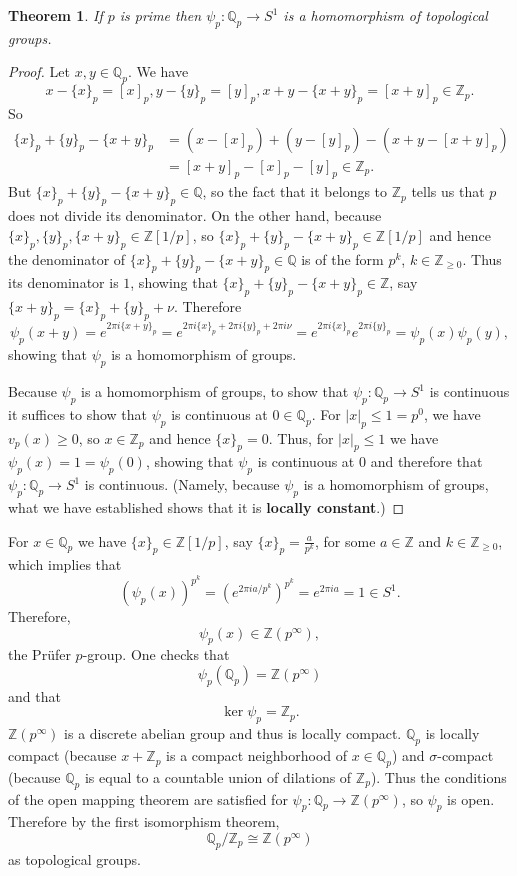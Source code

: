 \documentclass{article}
\newtheorem{theorem}{Theorem}
\theoremstyle{definition}
\begin{document}
\begin{theorem}
If $p$ is prime then $\psi_p:\mathbb{Q}_p \to S^1$ is a homomorphism of topological groups.
\label{psip}
\end{theorem}
\begin{proof}
Let $x,y \in \mathbb{Q}_p$. We have
\[
x-\{x\}_p=[x]_p,  y-\{y\}_p=[y]_p, 
x+y-\{x+y\}_p=[x+y]_p \in \mathbb{Z}_p.
\]
So
\begin{align*}
\{x\}_p+\{y\}_p-\{x+y\}_p& = (x-[x]_p)+(y-[y]_p)-(x+y-[x+y]_p)\\
&=
[x+y]_p - [x]_p - [y]_p \in \mathbb{Z}_p.
\end{align*}
But $\{x\}_p+\{y\}_p-\{x+y\}_p \in \mathbb{Q}$, so the fact that it belongs to $\mathbb{Z}_p$ tells us that $p$ does not divide
its denominator. On the other hand, because $\{x\}_p,\{y\}_p,\{x+y\}_p \in \mathbb{Z}[1/p]$, so 
$\{x\}_p+\{y\}_p-\{x+y\}_p \in \mathbb{Z}[1/p]$ and hence the denominator of $\{x\}_p+\{y\}_p-\{x+y\}_p \in \mathbb{Q}$ is of the form $p^k$, $k \in \mathbb{Z}_{\geq 0}$.
Thus its denominator is $1$, showing that $\{x\}_p+\{y\}_p-\{x+y\}_p \in \mathbb{Z}$,
say $\{x+y\}_p = \{x\}_p+\{y\}_p + \nu$.
Therefore
\[
\psi_p(x+y) = e^{2\pi i\{x+y\}_p}
=e^{2\pi i\{x\}_p + 2\pi i\{y\}_p + 2\pi i\nu}
=e^{2\pi i\{x\}_p} e^{2\pi i \{y\}_p}
=\psi_p(x) \psi_p(y),
\]
showing that $\psi_p$ is a homomorphism of groups.

Because $\psi_p$ is a homomorphism of groups, to show that $\psi_p:\mathbb{Q}_p \to S^1$ is continuous it suffices to show that
$\psi_p$ is continuous at $0 \in \mathbb{Q}_p$. 
For $|x|_p \leq 1=p^0$, we have $v_p(x) \geq 0$, so $x \in \mathbb{Z}_p$ and hence
$\{x\}_p=0$. Thus, for $|x|_p \leq 1$ we have $\psi_p(x)=1=\psi_p(0)$, showing that $\psi_p$ is continuous at $0$ and therefore
that $\psi_p:\mathbb{Q}_p \to S^1$ is continuous. (Namely, because $\psi_p$ is a homomorphism of groups, what we have
established shows that it is \textbf{locally constant}.)
\end{proof}

For $x \in \mathbb{Q}_p$ we have $\{x\}_p \in \mathbb{Z}[1/p]$, say
$\{x\}_p=\frac{a}{p^k}$, for some $a \in \mathbb{Z}$ and $k \in \mathbb{Z}_{\geq 0}$, which implies that
\[
(\psi_p(x))^{p^k} = (e^{2\pi i a/p^k})^{p^k} = e^{2\pi ia} = 1 \in S^1.
\]
Therefore,
\[
\psi_p(x) \in \mathbb{Z}(p^\infty),
\]
the Pr\"ufer $p$-group.
One checks that
\[
\psi_p(\mathbb{Q}_p) = \mathbb{Z}(p^\infty)
\]
and that
\[
\ker \psi_p = \mathbb{Z}_p.
\]
$\mathbb{Z}(p^\infty)$ is a discrete abelian group and thus is locally compact. 
$\mathbb{Q}_p$ is locally compact (because $x+\mathbb{Z}_p$ is a compact neighborhood of $x \in \mathbb{Q}_p$)
and $\sigma$-compact (because $\mathbb{Q}_p$ is equal to a countable union of dilations of $\mathbb{Z}_p$). Thus
the conditions of the open mapping theorem are satisfied for $\psi_p:\mathbb{Q}_p \to \mathbb{Z}(p^\infty)$, so
$\psi_p$ is open. Therefore by the first isomorphism theorem,
\[
\mathbb{Q}_p / \mathbb{Z}_p \cong  \mathbb{Z}(p^\infty)
\]
as topological groups.
\end{document}
